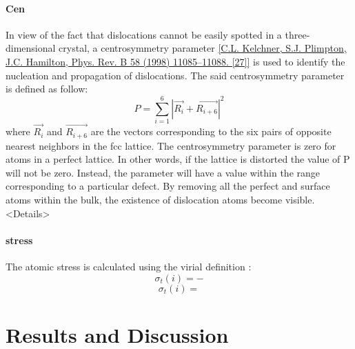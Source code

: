 \documentclass[final,5p,times,twocolumn]{elsarticle}
\begin{document}
\paragraph{Cen}
In view of the fact that dislocations cannot be easily spotted in a three-dimensional crystal, a centrosymmetry parameter \ref{C.L. Kelchner, S.J. Plimpton, J.C. Hamilton, Phys. Rev. B 58 (1998) 11085–11088. [27]} is used to identify the nucleation and propagation of dislocations. The said centrosymmetry parameter is defined as follow:
$$P = \displaystyle\sum_{i=1}^{6}|\vec{R_i}+\vec{R_{i+6}}|^2$$
where $\vec{R_i}$ and $\vec{R_{i+6}}$ are the vectors corresponding to the six pairs of opposite nearest neighbors in the fcc lattice. The centrosymmetry parameter is zero for atoms in a perfect lattice. In other words, if the lattice is distorted the value of P will not be zero. Instead, the parameter will have a value within the range corresponding to a particular defect. By removing all the perfect and surface atoms within the bulk, the existence of dislocation atoms become visible.<Details>
\paragraph{stress}
The atomic stress is calculated using the virial definition :
$$\sigma_t(i)=-$$
$$\sigma_t(i)= $$

\section{Results and Discussion}
\end{document}
